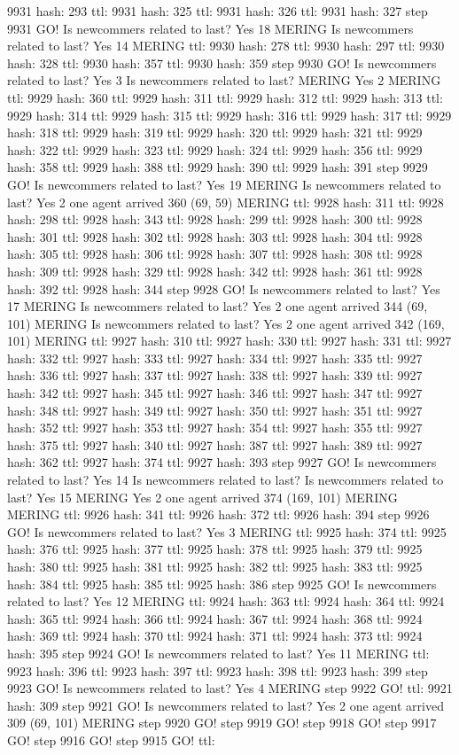 9931 hash: 293 ttl: 9931 hash: 325 ttl: 9931 hash: 326 ttl: 9931 hash: 327 step 9931 GO! Is newcommers related to last? Yes 18 MERING Is newcommers related to last? Yes 14 MERING ttl: 9930 hash: 278 ttl: 9930 hash: 297 ttl: 9930 hash: 328 ttl: 9930 hash: 357 ttl: 9930 hash: 359 step 9930 GO! Is newcommers related to last? Yes 3 Is newcommers related to last? MERING Yes 2 MERING ttl: 9929 hash: 360 ttl: 9929 hash: 311 ttl: 9929 hash: 312 ttl: 9929 hash: 313 ttl: 9929 hash: 314 ttl: 9929 hash: 315 ttl: 9929 hash: 316 ttl: 9929 hash: 317 ttl: 9929 hash: 318 ttl: 9929 hash: 319 ttl: 9929 hash: 320 ttl: 9929 hash: 321 ttl: 9929 hash: 322 ttl: 9929 hash: 323 ttl: 9929 hash: 324 ttl: 9929 hash: 356 ttl: 9929 hash: 358 ttl: 9929 hash: 388 ttl: 9929 hash: 390 ttl: 9929 hash: 391 step 9929 GO! Is newcommers related to last? Yes 19 MERING Is newcommers related to last? Yes 2 one agent arrived 360 (69, 59) MERING ttl: 9928 hash: 311 ttl: 9928 hash: 298 ttl: 9928 hash: 343 ttl: 9928 hash: 299 ttl: 9928 hash: 300 ttl: 9928 hash: 301 ttl: 9928 hash: 302 ttl: 9928 hash: 303 ttl: 9928 hash: 304 ttl: 9928 hash: 305 ttl: 9928 hash: 306 ttl: 9928 hash: 307 ttl: 9928 hash: 308 ttl: 9928 hash: 309 ttl: 9928 hash: 329 ttl: 9928 hash: 342 ttl: 9928 hash: 361 ttl: 9928 hash: 392 ttl: 9928 hash: 344 step 9928 GO! Is newcommers related to last? Yes 17 MERING Is newcommers related to last? Yes 2 one agent arrived 344 (69, 101) MERING Is newcommers related to last? Yes 2 one agent arrived 342 (169, 101) MERING ttl: 9927 hash: 310 ttl: 9927 hash: 330 ttl: 9927 hash: 331 ttl: 9927 hash: 332 ttl: 9927 hash: 333 ttl: 9927 hash: 334 ttl: 9927 hash: 335 ttl: 9927 hash: 336 ttl: 9927 hash: 337 ttl: 9927 hash: 338 ttl: 9927 hash: 339 ttl: 9927 hash: 342 ttl: 9927 hash: 345 ttl: 9927 hash: 346 ttl: 9927 hash: 347 ttl: 9927 hash: 348 ttl: 9927 hash: 349 ttl: 9927 hash: 350 ttl: 9927 hash: 351 ttl: 9927 hash: 352 ttl: 9927 hash: 353 ttl: 9927 hash: 354 ttl: 9927 hash: 355 ttl: 9927 hash: 375 ttl: 9927 hash: 340 ttl: 9927 hash: 387 ttl: 9927 hash: 389 ttl: 9927 hash: 362 ttl: 9927 hash: 374 ttl: 9927 hash: 393 step 9927 GO! Is newcommers related to last? Yes 14 Is newcommers related to last? Is newcommers related to last? Yes 15 MERING Yes 2 one agent arrived 374 (169, 101) MERING MERING ttl: 9926 hash: 341 ttl: 9926 hash: 372 ttl: 9926 hash: 394 step 9926 GO! Is newcommers related to last? Yes 3 MERING ttl: 9925 hash: 374 ttl: 9925 hash: 376 ttl: 9925 hash: 377 ttl: 9925 hash: 378 ttl: 9925 hash: 379 ttl: 9925 hash: 380 ttl: 9925 hash: 381 ttl: 9925 hash: 382 ttl: 9925 hash: 383 ttl: 9925 hash: 384 ttl: 9925 hash: 385 ttl: 9925 hash: 386 step 9925 GO! Is newcommers related to last? Yes 12 MERING ttl: 9924 hash: 363 ttl: 9924 hash: 364 ttl: 9924 hash: 365 ttl: 9924 hash: 366 ttl: 9924 hash: 367 ttl: 9924 hash: 368 ttl: 9924 hash: 369 ttl: 9924 hash: 370 ttl: 9924 hash: 371 ttl: 9924 hash: 373 ttl: 9924 hash: 395 step 9924 GO! Is newcommers related to last? Yes 11 MERING ttl: 9923 hash: 396 ttl: 9923 hash: 397 ttl: 9923 hash: 398 ttl: 9923 hash: 399 step 9923 GO! Is newcommers related to last? Yes 4 MERING step 9922 GO! ttl: 9921 hash: 309 step 9921 GO! Is newcommers related to last? Yes 2 one agent arrived 309 (69, 101) MERING step 9920 GO! step 9919 GO! step 9918 GO! step 9917 GO! step 9916 GO! step 9915 GO! ttl: 